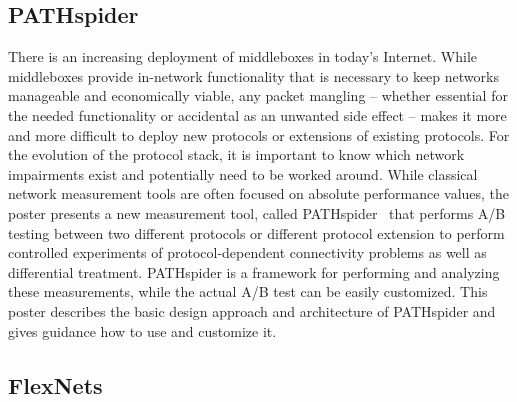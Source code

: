 \subsection{PATHspider}

There is an increasing deployment of middleboxes in today’s Internet.  While
middleboxes provide in-network functionality that is necessary to keep
networks manageable and economically viable, any packet mangling – whether
essential for the needed functionality or accidental as an unwanted side
effect – makes it more and more difficult to deploy new protocols or
extensions of existing protocols. For the evolution of the protocol stack, it
is important to know which network impairments exist and potentially need to
be worked around. While classical network measurement tools are often focused
on absolute performance values, the poster presents a new measurement tool,
called PATHspider~\cite{ilearmonth:anrw:2016} that performs A/B testing
between two different protocols or different protocol extension to perform
controlled experiments of protocol-dependent connectivity problems as well as
differential treatment.  PATHspider is a framework for performing and
analyzing these measurements, while the actual A/B test can be easily
customized. This poster describes the basic design approach and architecture
of PATHspider and gives guidance how to use and customize it.

\subsection{FlexNets}

